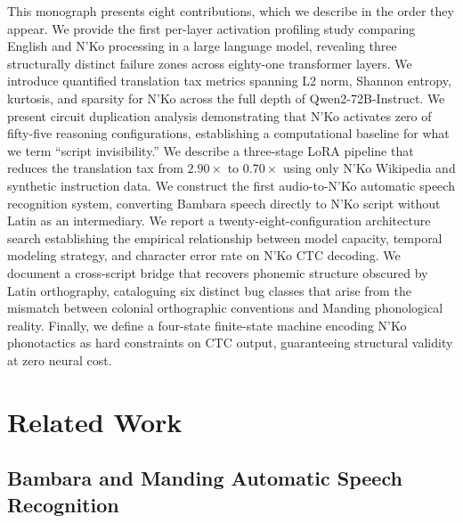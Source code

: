 \documentclass[11pt]{article}
\newcommand{\nko}{N'Ko}
\begin{document}
This monograph presents eight contributions, which we describe in the order they appear. We provide the first per-layer activation profiling study comparing English and \nko{} processing in a large language model, revealing three structurally distinct failure zones across eighty-one transformer layers. We introduce quantified translation tax metrics spanning L2 norm, Shannon entropy, kurtosis, and sparsity for \nko{} across the full depth of Qwen2-72B-Instruct. We present circuit duplication analysis demonstrating that \nko{} activates zero of fifty-five reasoning configurations, establishing a computational baseline for what we term ``script invisibility.'' We describe a three-stage LoRA pipeline that reduces the translation tax from $2.90\times$ to $0.70\times$ using only \nko{} Wikipedia and synthetic instruction data. We construct the first audio-to-\nko{} automatic speech recognition system, converting Bambara speech directly to \nko{} script without Latin as an intermediary. We report a twenty-eight-configuration architecture search establishing the empirical relationship between model capacity, temporal modeling strategy, and character error rate on \nko{} CTC decoding. We document a cross-script bridge that recovers phonemic structure obscured by Latin orthography, cataloguing six distinct bug classes that arise from the mismatch between colonial orthographic conventions and Manding phonological reality. Finally, we define a four-state finite-state machine encoding \nko{} phonotactics as hard constraints on CTC output, guaranteeing structural validity at zero neural cost.

\section{Related Work}
\label{sec:related_work}

\subsection{Bambara and Manding Automatic Speech Recognition}
\label{sec:related_bambara}
\end{document}

